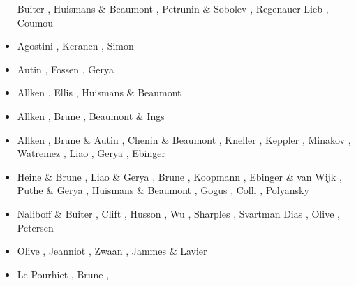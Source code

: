 \begin{scriptsize}
\begin{itemize}
                         Buiter \etal \cite{buhb08}, Huismans \& Beaumont \cite{hube08},
                         Petrunin \& Sobolev \cite{peso08}, Regenauer-Lieb \etal \cite{rerw08},
                         Coumou \etal \cite{codh08}
\item[\twothousandnine] Agostini \etal \cite{agcz09}, Keranen \etal \cite{kekj09},
                        Simon \etal \cite{sihb09}
\item[\twothousandten] Autin \etal \cite{aubh10}, Fossen \etal \cite{fosr10}, 
                       Gerya \cite{gerya2010}
\item[\twothousandeleven] Allken \etal \cite{alht11}, Ellis \etal \cite{ellw11},
                          Huismans \& Beaumont \cite{hube11}
\item[\twothousandtwelve] Allken \etal \cite{alht12}, Brune \etal \cite{brps12},
                          Beaumont \& Ings \cite{bein12}
\item[\twothousandthirteen] Allken \etal \cite{alhf13}, Brune \& Autin \cite{brau13},
                            Chenin \& Beaumont \cite{chbe13}, Kneller \etal \cite{knak13},
                            Keppler \etal \cite{kern13}, Minakov \etal \cite{mipf13},
                            Watremez \etal \cite{wabd13}, Liao \etal \cite{ligw13}, 
                            Gerya \cite{gery13c,gery13}, Ebinger \etal \cite{ebvk13}
\item[\twothousandfourteen] Heine \& Brune \cite{hebr14}, Liao \& Gerya \cite{lige14,lige14b},
                            Brune \cite{brun14}, Koopmann \etal \cite{kobf14},
                            Ebinger \& van Wijk \cite{ebva14}, Puthe \& Gerya \cite{puge14},
                            Huismans \& Beaumont \cite{hube14},
                            Gogus \cite{gogu14}, 
                            Colli \etal \cite{cosb14}, Polyansky \etal \cite{pokb14}
\item[\twothousandfifteen] Naliboff \& Buiter \cite{nabu15}, Clift \etal \cite{clbq15}, 
                     Husson \etal \cite{huyb15}, Wu \etal \cite{wulc15},
                     Sharples \etal \cite{shmj15}, Svartman Dias \etal \cite{svlh15},
                     Olive \etal \cite{olbi15}, Petersen \etal \cite{pean15}
\item[\twothousandsixteen] Olive \etal \cite{olbm16}, Jeanniot \etal \cite{jekm16},
                           Zwaan \etal \cite{zwsn16}, Jammes \& Lavier \cite{jala16}
\item[\twothousandseventeen] Le Pourhiet \etal \cite{lemh17}, Brune \etal \cite{brcr17},

\end{itemize}
\end{scriptsize}
